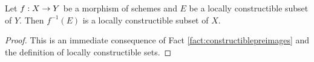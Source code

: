 \begin{fact}
Let $f:X\rightarrow Y$ be a morphism of schemes and $E$ be a locally constructible subset of $Y$. Then $f^{-1}(E)$ is a locally constructible subset of $X$.
\end{fact}
\begin{proof}
This is an immediate consequence of Fact \ref{fact:constructiblepreimages} and the definition of locally constructible sets.
\end{proof}

















































































\small




